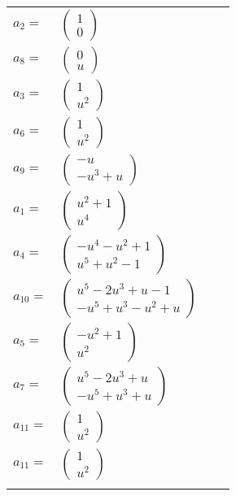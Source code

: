 \documentclass[1p]{elsarticle_modified}
\theoremstyle{definition}
\begin{document}
\begin{tabular}{m{7pt} m{180pt} m{7pt} m{180pt} }
\flushright $a_{2}=$&$\begin{pmatrix}1\\0\end{pmatrix}$ \\
\flushright $a_{8}=$&$\begin{pmatrix}0\\u\end{pmatrix}$ \\
\flushright $a_{3}=$&$\begin{pmatrix}1\\u^2\end{pmatrix}$ \\
\flushright $a_{6}=$&$\begin{pmatrix}1\\u^2\end{pmatrix}$ \\
\flushright $a_{9}=$&$\begin{pmatrix}- u\\- u^3+u\end{pmatrix}$ \\
\flushright $a_{1}=$&$\begin{pmatrix}u^2+1\\u^4\end{pmatrix}$ \\
\flushright $a_{4}=$&$\begin{pmatrix}- u^4- u^2+1\\u^5+u^2-1\end{pmatrix}$ \\
\flushright $a_{10}=$&$\begin{pmatrix}u^5-2 u^3+u-1\\- u^5+u^3- u^2+u\end{pmatrix}$ \\
\flushright $a_{5}=$&$\begin{pmatrix}- u^2+1\\u^2\end{pmatrix}$ \\
\flushright $a_{7}=$&$\begin{pmatrix}u^5-2 u^3+u\\- u^5+u^3+u\end{pmatrix}$ \\
\flushright $a_{11}=$&$\begin{pmatrix}1\\u^2\end{pmatrix}$\\ \flushright $a_{11}=$&$\begin{pmatrix}1\\u^2\end{pmatrix}$\\&\end{tabular}
\end{document}
